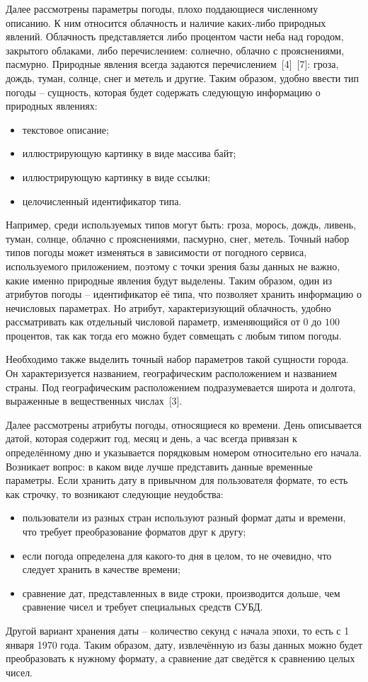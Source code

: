 Далее рассмотрены параметры погоды, плохо поддающиеся численному описанию.
К ним относится облачность и наличие каких-либо природных явлений.
Облачность представляется либо процентом части неба над городом, закрытого облаками, либо перечислением: солнечно, облачно с прояснениями, пасмурно.
Природные явления всегда задаются перечислением~[4]~[7]: гроза, дождь, туман, солнце, снег и метель и другие.
Таким образом, удобно ввести тип погоды -- сущность, которая будет содержать следующую информацию о природных явлениях:
\begin{itemize}
    \item текстовое описание;
    \item иллюстрирующую картинку в виде массива байт;
    \item иллюстрирующую картинку в виде ссылки;
    \item целочисленный идентификатор типа.
\end{itemize}
Например, среди используемых типов могут быть: гроза, морось, дождь, ливень, туман, солнце, облачно с прояснениями, пасмурно, снег, метель.
Точный набор типов погоды может изменяться в зависимости от погодного сервиса, используемого приложением, поэтому с точки зрения базы данных не важно, какие именно природные явления будут выделены.
Таким образом, один из атрибутов погоды -- идентификатор её типа, что позволяет хранить информацию о нечисловых параметрах.
Но атрибут, характеризующий облачность, удобно рассматривать как отдельный числовой параметр, изменяющийся от $0$ до $100$ процентов, так как тогда его можно будет совмещать с любым типом погоды.

Необходимо также выделить точный набор параметров такой сущности города.
Он характеризуется названием, географическим расположением и названием страны.
Под географическим расположением подразумевается широта и долгота, выраженные в вещественных числах~[3].

Далее рассмотрены атрибуты погоды, относящиеся ко времени.
День описывается датой, которая содержит год, месяц и день, а час всегда привязан к определённому дню и указывается порядковым номером относительно его начала.
Возникает вопрос: в каком виде лучше представить данные временные параметры.
Если хранить дату в привычном для пользователя формате, то есть как строчку, то возникают следующие неудобства:
\begin{itemize}
    \item
        пользователи из разных стран используют разный формат даты и времени, что требует преобразование форматов друг к другу;
    \item
        если погода определена для какого-то дня в целом, то не очевидно, что следует хранить в качестве времени;
    \item
        сравнение дат, представленных в виде строки, производится дольше, чем сравнение чисел и требует специальных средств СУБД.
\end{itemize}
Другой вариант хранения даты -- количество секунд с начала эпохи, то есть с 1 января 1970 года.
Таким образом, дату, извлечённую из базы данных можно будет преобразовать к нужному формату, а сравнение дат сведётся к сравнению целых чисел.

